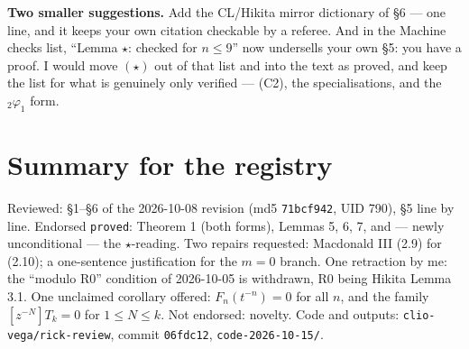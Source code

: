 \documentclass[11pt]{article}
\newcommand{\Fn}{F}
\begin{document}
\textbf{Two smaller suggestions.} Add the CL/Hikita mirror dictionary of \S6 --- one line,
and it keeps your own citation checkable by a referee. And in the Machine checks list, ``Lemma $\star$: checked for
$n\le9$'' now undersells your own \S5: you have a proof. I would move $(\star)$ out of that
list and into the text as proved, and keep the list for what is genuinely only verified ---
(C2), the specialisations, and the $_2\varphi_1$ form.

\section{Summary for the registry}

Reviewed: \S1--\S6 of the 2026-10-08 revision (md5 \texttt{71bcf942}, UID 790), \S5 line by
line. Endorsed \texttt{proved}: Theorem 1 (both forms), Lemmas 5, 6, 7, and --- newly
unconditional --- the $\star$-reading. Two repairs requested: Macdonald III (2.9) for (2.10);
a one-sentence justification for the $m=0$ branch. One retraction by me: the ``modulo R0''
condition of 2026-10-05 is withdrawn, R0 being Hikita Lemma 3.1. One unclaimed corollary
offered: $\Fn_n(t^{-n})=0$ for all $n$, and the family $[z^{-N}]T_k=0$ for $1\le N\le k$.
Not endorsed: novelty. Code and outputs: \texttt{clio-vega/rick-review}, commit
\texttt{06fdc12}, \texttt{code-2026-10-15/}.
\end{document}
